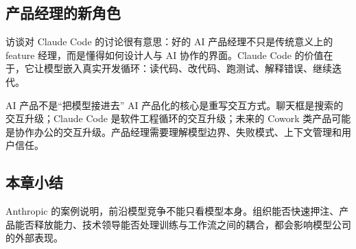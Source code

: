 \subsection{产品经理的新角色}

访谈对 Claude Code 的讨论很有意思：好的 AI 产品经理不只是传统意义上的 feature 经理，而是懂得如何设计人与 AI 协作的界面。Claude Code 的价值在于，它让模型嵌入真实开发循环：读代码、改代码、跑测试、解释错误、继续迭代。

\begin{knowledgebox}{AI 产品不是“把模型接进去”}
AI 产品化的核心是重写交互方式。聊天框是搜索的交互升级；Claude Code 是软件工程循环的交互升级；未来的 Cowork 类产品可能是协作办公的交互升级。产品经理需要理解模型边界、失败模式、上下文管理和用户信任。
\end{knowledgebox}

\subsection{本章小结}

Anthropic 的案例说明，前沿模型竞争不能只看模型本身。组织能否快速押注、产品能否释放能力、技术领导能否处理训练与工作流之间的耦合，都会影响模型公司的外部表现。

